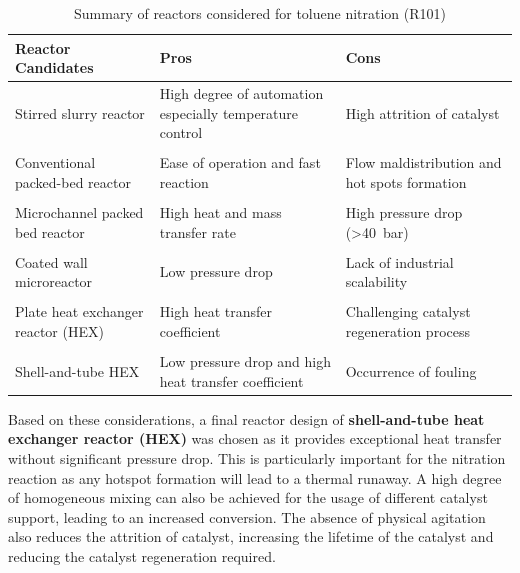 \begin{table}[H]
\caption{Summary of reactors considered for toluene nitration (R101)}
\label{tab:reactorchoices}
\begin{tabularx}{\linewidth}{@{}lXX@{}}
\toprule
\textbf{Reactor Candidates}                 & \textbf{Pros}                                                                                               & \textbf{Cons}                                                                                    \\ \midrule
Stirred slurry reactor    & High degree of automation especially temperature control & High attrition of catalyst                                                              \\
\\
Conventional packed-bed reactor    & Ease of operation and fast reaction                                                                & Flow maldistribution and hot spots formation 
\\
\\
Microchannel packed bed reactor    & High heat and mass transfer rate                                                                   & High pressure drop (\SI{>40}{\bar})                                               \\
\\
Coated wall microreactor           & Low pressure drop                                                                                  & Lack of industrial scalability                                                          \\
\\
Plate heat exchanger reactor (HEX) & High heat transfer coefficient                                                                     & Challenging catalyst regeneration process     \\
\\
Shell-and-tube HEX                 & Low pressure drop and high heat transfer coefficient     & Occurrence of fouling                                                                                      \\ \bottomrule
\end{tabularx}
\end{table}

Based on these considerations, a final reactor design of  \textbf{shell-and-tube heat exchanger reactor (HEX) }was chosen as it provides exceptional heat transfer without significant pressure drop. This is particularly important for the nitration reaction as any hotspot formation will lead to a thermal runaway. A high degree of homogeneous mixing can also be achieved for the usage of different catalyst support, leading to an increased conversion. The absence of physical agitation also reduces the attrition of catalyst, increasing the lifetime of the catalyst and reducing the catalyst regeneration required.

